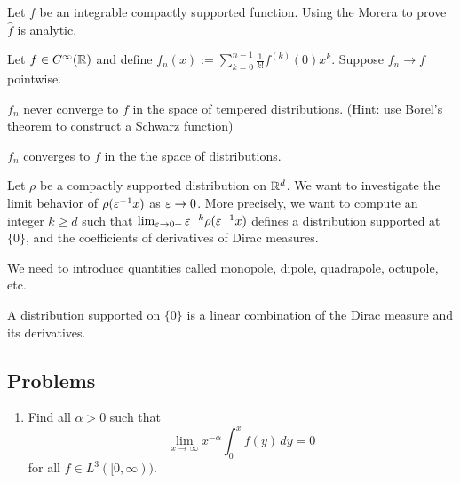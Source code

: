 \documentclass{../../large}
\begin{document}
\begin{prb}
Let $f$ be an integrable compactly supported function.
Using the Morera to prove $\hat f$ is analytic.

\end{prb}

\begin{prb}
Let $f\in C^\infty(\mathbb{R})$ and define $f_n(x):=\sum_{k=0}^{n-1}\frac1{k!}f^{(k)}(0)x^k$.
Suppose $f_n\to f$ pointwise.
\begin{parts}
\item $f_n$ never converge to $f$ in the space of tempered distributions. (Hint: use Borel's theorem to construct a Schwarz function)
\item $f_n$ converges to $f$ in the the space of distributions.
\end{parts}
\end{prb}


\begin{prb}
Let $\rho$ be a compactly supported distribution on $\mathbb{R}^d$.
We want to investigate the limit behavior of $\rho(\varepsilon^{-1}x)$ as $\varepsilon\to0$.
More precisely, we want to compute an integer $k\ge d$ such that $\lim_{\varepsilon\to0+}\varepsilon^{-k}\rho(\varepsilon^{-1}x)$ defines a distribution supported at $\{0\}$, and the coefficients of derivatives of Dirac measures.

We need to introduce quantities called monopole, dipole, quadrapole, octupole, etc.
\begin{parts}
\item A distribution supported on $\{0\}$ is a linear combination of the Dirac measure and its derivatives.
\item 
\end{parts}
\end{prb}

\section*{Problems}
\begin{enumerate}
\item Find all $\alpha>0$ such that
\[\lim_{x\to\infty}x^{-\alpha}\int_0^xf(y)\,dy=0\]
for all $f\in L^3([0,\infty))$.
\end{enumerate}


\chapter{}
\end{document}
